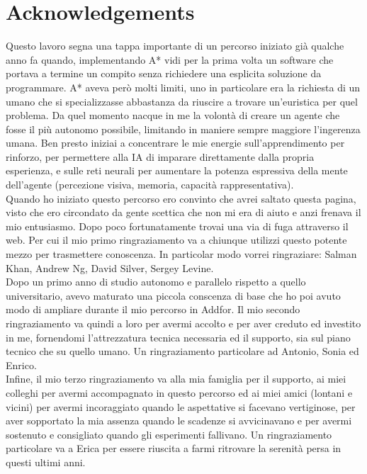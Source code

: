 \chapter*{Acknowledgements}
\thispagestyle{empty}

Questo lavoro segna una tappa importante di un percorso iniziato già qualche anno fa quando, implementando A* vidi per la prima volta un software che portava a termine un compito senza richiedere una esplicita soluzione da programmare. A* aveva però molti limiti, uno in particolare era la richiesta di un umano che si specializzasse abbastanza da riuscire a trovare un'euristica per quel problema.  Da quel momento nacque in me la volontà di creare un agente che fosse il più autonomo possibile, limitando in maniere sempre maggiore l'ingerenza umana. Ben presto iniziai a concentrare le mie energie sull'apprendimento per rinforzo, per permettere alla IA di imparare direttamente dalla propria esperienza, e sulle reti neurali per aumentare la potenza espressiva della mente dell'agente (percezione visiva, memoria, capacità rappresentativa).
\\
\newline
Quando ho iniziato questo percorso ero convinto che avrei saltato questa pagina, visto che ero circondato da gente scettica che non mi era di aiuto e anzi frenava il mio entusiasmo. Dopo poco fortunatamente trovai una via di fuga attraverso il web. Per cui il mio primo ringraziamento va a chiunque utilizzi questo potente mezzo per trasmettere conoscenza. In particolar modo vorrei ringraziare: Salman Khan, Andrew Ng, David Silver, Sergey Levine.
\\
\newline
Dopo un primo anno di studio autonomo e parallelo rispetto a quello universitario, avevo maturato una piccola conscenza di base che ho poi avuto modo di ampliare durante il mio percorso in Addfor. Il mio secondo ringraziamento va quindi a loro per avermi accolto e per aver creduto ed investito in me, fornendomi l'attrezzatura tecnica necessaria ed il supporto, sia sul piano tecnico che su quello umano. Un ringraziamento particolare ad Antonio, Sonia ed Enrico.
\\
\newline
Infine, il mio terzo ringraziamento va alla mia famiglia per il supporto, ai miei colleghi per avermi accompagnato in questo percorso ed ai miei amici (lontani e vicini) per avermi incoraggiato quando le aspettative si facevano vertiginose, per aver sopportato la mia assenza quando le scadenze si avvicinavano e per avermi sostenuto e consigliato quando gli esperimenti fallivano. 
Un ringraziamento particolare va a Erica per essere riuscita a farmi ritrovare la serenità persa in questi ultimi anni.

\clearpage